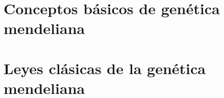 



\section{Conceptos básicos de genética mendeliana}


\section{Leyes clásicas de la genética mendeliana}




